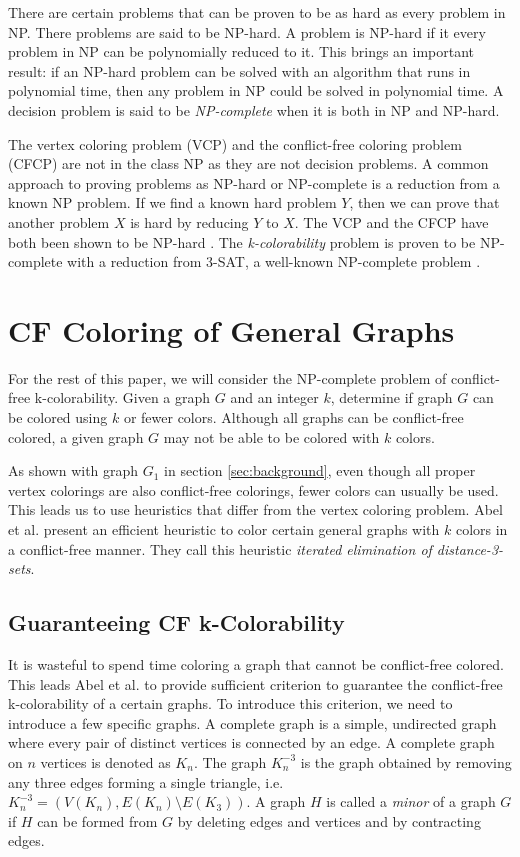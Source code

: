 \documentclass{sig-alternate}
\begin{document}
There are certain problems that can be proven to be as hard as every problem in NP. There problems are said to be NP-hard. A problem is NP-hard if it every problem in NP can be polynomially reduced to it. This brings an important result: if an NP-hard problem can be solved with an algorithm that runs in polynomial time, then any problem in NP could be solved in polynomial time. A decision problem is said to be \emph{NP-complete} when it is both in NP and NP-hard.

The vertex coloring problem (VCP) and the conflict-free coloring problem (CFCP) are not in the class NP as they are not decision problems. A common approach to proving problems as NP-hard or NP-complete is a reduction from a known NP problem. If we find a known hard problem $Y$, then we can prove that another problem $X$ is hard by reducing $Y$ to $X$. The VCP and the CFCP have both been shown to be NP-hard \cite{abel2017three,moret1998theory}. The \emph{k-colorability} problem is proven to be NP-complete with a reduction from 3-SAT, a well-known NP-complete problem \cite{sharma2012new}.

\section{CF Coloring of General Graphs}
For the rest of this paper, we will consider the NP-complete problem of conflict-free k-colorability. Given a graph $G$ and an integer $k$, determine if graph $G$ can be colored using $k$ or fewer colors. Although all graphs can be conflict-free colored, a given graph $G$ may not be able to be colored with $k$ colors.

As shown with graph $G_1$ in section \ref{sec:background}, even though all proper vertex colorings are also conflict-free colorings, fewer colors can usually be used. This leads us to use heuristics that differ from the vertex coloring problem. Abel et al. \cite{abel2017three} present an efficient heuristic to color certain general graphs with $k$ colors in a conflict-free manner. They call this heuristic \emph{iterated elimination of distance-3-sets}.

\subsection{Guaranteeing CF k-Colorability}
It is wasteful to spend time coloring a graph that cannot be conflict-free colored. This leads Abel et al. to provide sufficient criterion to guarantee the conflict-free k-colorability of a certain graphs. To introduce this criterion, we need to introduce a few specific graphs. A complete graph is a simple, undirected graph where every pair of distinct vertices is connected by an edge. A complete graph on $n$ vertices is denoted as $K_n$. The graph $K_n^{-3}$ is the graph obtained by removing any three edges forming a single triangle, i.e. \(K_n^{-3} =  \left ( V(K_n), E(K_n) \setminus E(K_3) \right ) \). A graph $H$ is called a \emph{minor} of a graph $G$ if $H$ can be formed from $G$ by deleting edges and vertices and by contracting edges. \cite{abel2017three,bondy1976graph}
\end{document}
